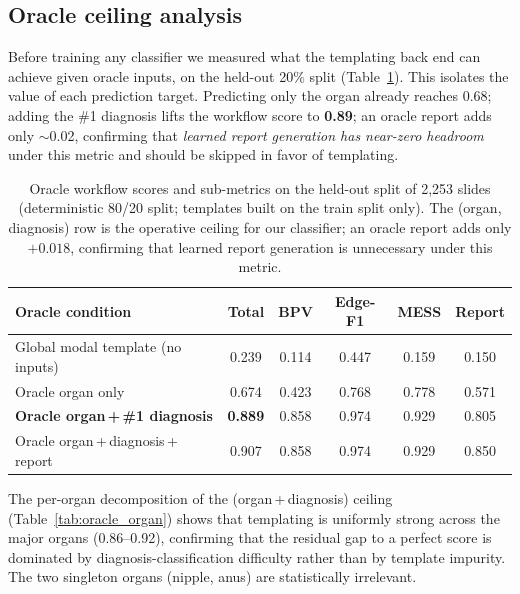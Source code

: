 \documentclass[11pt,a4paper]{article}
\begin{document}
\subsection{Oracle ceiling analysis}
Before training any classifier we measured what the templating back end can achieve given
oracle inputs, on the held-out 20\% split (Table~\ref{tab:oracle}). This isolates the value of
each prediction target. Predicting only the organ already reaches 0.68; adding the \#1
diagnosis lifts the workflow score to \textbf{0.89}; an oracle report adds only $\sim$0.02,
confirming that \emph{learned report generation has near-zero headroom} under this metric and
should be skipped in favor of templating.

\begin{table}[h]
\centering
\caption{Oracle workflow scores and sub-metrics on the held-out split of 2{,}253 slides
(deterministic 80/20 split; templates built on the train split only). The (organ, diagnosis)
row is the operative ceiling for our classifier; an oracle report adds only $+0.018$, confirming
that learned report generation is unnecessary under this metric.}
\label{tab:oracle}
\begin{tabular}{lccccc}
\toprule
Oracle condition & Total & BPV & Edge-F1 & MESS & Report \\
\midrule
Global modal template (no inputs) & 0.239 & 0.114 & 0.447 & 0.159 & 0.150 \\
Oracle organ only & 0.674 & 0.423 & 0.768 & 0.778 & 0.571 \\
\textbf{Oracle organ\,+\,\#1 diagnosis} & \textbf{0.889} & 0.858 & 0.974 & 0.929 & 0.805 \\
Oracle organ\,+\,diagnosis\,+\,report & 0.907 & 0.858 & 0.974 & 0.929 & 0.850 \\
\bottomrule
\end{tabular}
\end{table}

The per-organ decomposition of the (organ\,+\,diagnosis) ceiling (Table~\ref{tab:oracle_organ})
shows that templating is uniformly strong across the major organs (0.86--0.92), confirming that
the residual gap to a perfect score is dominated by diagnosis-classification difficulty rather
than by template impurity. The two singleton organs (nipple, anus) are statistically
irrelevant.
\end{document}
